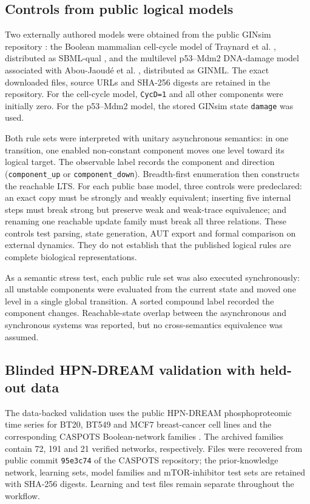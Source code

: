 \documentclass[pdflatex,sn-mathphys-ay]{sn-jnl}
\theoremstyle{definition}
\begin{document}
\subsection{Controls from public logical models}\label{sec:public-method}

Two externally authored models were obtained from the public GINsim repository
\citep{Naldi2018}: the Boolean mammalian cell-cycle model of Traynard et al.
\citep{Traynard2016}, distributed as SBML-qual \citep{Chaouiya2013SBML}, and the
multilevel p53--Mdm2 DNA-damage model associated with Abou-Jaoud\'e et al.
\citep{AbouJaoude2009}, distributed as GINML. The exact downloaded files, source
URLs and SHA-256 digests are retained in the repository. For the cell-cycle
model, \texttt{CycD=1} and all other components were initially zero. For the
p53--Mdm2 model, the stored GINsim state \texttt{damage} was used.

Both rule sets were interpreted with unitary asynchronous semantics: in one
transition, one enabled non-constant component moves one level toward its
logical target. The observable label records the component and direction
(\texttt{component\_up} or \texttt{component\_down}). Breadth-first enumeration
then constructs the reachable LTS. For each public base model, three controls
were predeclared: an exact copy must be strongly and weakly equivalent; inserting
five internal steps must break strong but preserve weak and weak-trace
equivalence; and renaming one reachable update family must break all three
relations. These controls test parsing, state generation, AUT export and formal
comparison on external dynamics. They do not establish that the published
logical rules are complete biological representations.

As a semantic stress test, each public rule set was also executed synchronously:
all unstable components were evaluated from the current state and moved one
level in a single global transition. A sorted compound label recorded the
component changes. Reachable-state overlap between the asynchronous and
synchronous systems was reported, but no cross-semantics equivalence was
assumed.

\subsection{Blinded HPN-DREAM validation with held-out data}
\label{sec:hpn-method}

The data-backed validation uses the public HPN-DREAM phosphoproteomic time series
for BT20, BT549 and MCF7 breast-cancer cell lines \citep{Hill2016} and the
corresponding CASPOTS Boolean-network families \citep{Razzaq2018}. The archived
families contain 72, 191 and 21 verified
networks, respectively. Files were recovered from public commit
\texttt{95e3c74} of the CASPOTS repository; the prior-knowledge network, learning
sets, model families and mTOR-inhibitor test sets are retained with SHA-256
digests. Learning and test files remain separate throughout the workflow.
\end{document}
